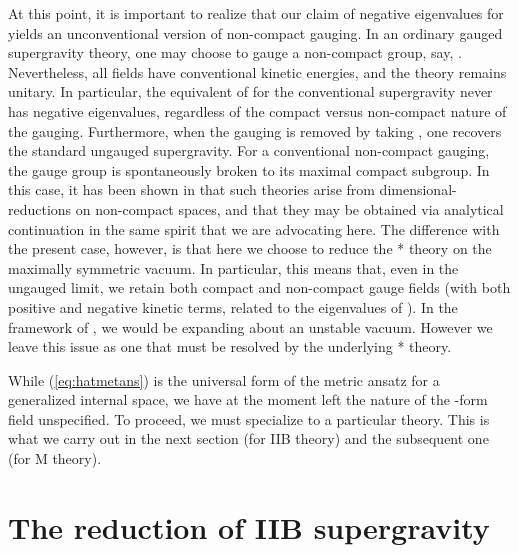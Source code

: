 \documentclass[a4paper,12pt]{article}
\begin{document}
At this point, it is important to realize that our claim of negative
eigenvalues for \coordHE{} yields an unconventional version of non-compact
gauging.  In an ordinary gauged supergravity theory, one may choose to
gauge a non-compact group, say, \coordHE{}.  Nevertheless, all fields
have conventional kinetic energies, and the theory remains unitary.  In
particular, the equivalent of \coordHE{} for the conventional
supergravity never has negative eigenvalues, regardless of the compact
versus non-compact nature of the gauging.  Furthermore, when the gauging
is removed by taking \coordHE{}, one recovers the standard ungauged
supergravity.  For a conventional non-compact gauging, the gauge group is
spontaneously broken to its maximal compact subgroup.  In this case, it
has been shown in \cite{HullWarner,Gibbons} that such theories arise from
dimensional-reductions on non-compact spaces, and that they may be
obtained via analytical continuation in the same spirit that we are
advocating here.  The difference with the present case, however, is that
here we choose to reduce the * theory on the maximally symmetric vacuum.
In particular, this means that, even in the ungauged limit, we retain
both compact and non-compact gauge fields (with both positive and negative
kinetic terms, related to the eigenvalues of \coordHE{}).  In the
framework of \cite{HullWarner}, we would be expanding about an unstable
vacuum.  However we leave this issue as one that must be resolved by the
underlying * theory.

While (\ref{eq:hatmetans}) is the universal form of the metric ansatz
for a generalized internal space, we have at the moment left the nature
of the \coordHE{}-form field unspecified.  To proceed, we must specialize to
a particular theory.  This is what we carry out in the next section
(for IIB\myHighlight{$^*$}\coordHE{} theory) and the subsequent one (for M\myHighlight{$^*$}\coordHE{} theory).

\section{The \coordHE{} reduction of IIB\myHighlight{$^*$}\coordHE{} supergravity}
\end{document}
